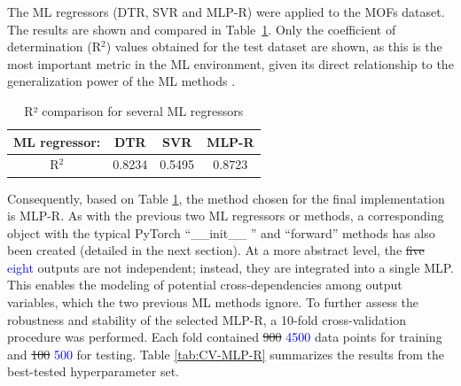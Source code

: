 \documentclass[review]{elsarticle}
\begin{document}
The ML regressors (DTR, SVR and MLP-R) were applied to the MOFs dataset. The 
results are shown and compared in Table~\ref{tab:placeholder}. Only the 
coefficient of determination (R$^2$) values obtained for the test dataset are 
shown, as this is the most important metric in the ML environment, given its 
direct relationship to the generalization power of the ML methods 
\cite{goodfellow2016deep}.

\begin{table}[H]
    \centering
    \begin{tabular}{|c|c|c|c|}\hline
         ML regressor:&  DTR&     SVR&     MLP-R\\\hline
         R$^2$&          0.8234&  0.5495&  0.8723\\\hline
    \end{tabular}
    \caption{R² comparison for several ML regressors}
    \label{tab:placeholder}
\end{table}

Consequently, based on Table \ref{tab:placeholder}, the method chosen for the 
final implementation is MLP-R. As with the previous two ML regressors or 
methods, a corresponding object with the typical PyTorch ``\_\_init\_\_ '' and 
``forward'' methods has also been created (detailed in the next section). At a 
more abstract level, the \sout{five} \textcolor{blue}{eight} outputs are not 
independent; instead, they are integrated into a single MLP. This enables the 
modeling of potential cross‑dependencies among output variables, which the two 
previous ML methods ignore. To further assess the robustness and stability of the selected MLP-R, a 10-fold 
cross-validation procedure was performed. Each fold contained \sout{900} 
\textcolor{blue}{4500} data points for training and \sout{100} 
\textcolor{blue}{500} for testing. Table \ref{tab:CV-MLP-R} summarizes the 
results from the best-tested hyperparameter set.
\end{document}
